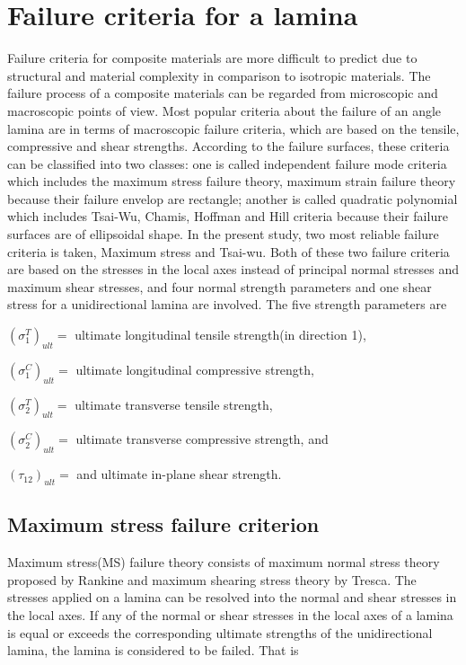 \section{Failure criteria for a lamina}

Failure criteria for composite materials are more difficult to predict due to
structural and material complexity in comparison to isotropic materials. The
failure process of a composite materials can be regarded from microscopic and
macroscopic points of view. Most popular criteria about the failure of an angle
lamina are in terms of macroscopic failure criteria, which are based on the
tensile, compressive and shear strengths. According to the failure surfaces,
these criteria can be classified into two classes: one is called independent
failure mode criteria which includes the maximum stress failure theory, maximum
strain failure theory because their failure envelop are rectangle; another is
called quadratic polynomial which includes Tsai-Wu, Chamis, Hoffman and Hill
criteria because their failure surfaces are of ellipsoidal shape. In the present
study, two most reliable failure criteria is taken, Maximum stress and Tsai-wu.
Both of these two failure criteria are based on the stresses in the local axes
instead of principal normal stresses and maximum shear stresses, and four normal
strength parameters and one shear stress for a unidirectional lamina are
involved. The five strength parameters are

$(\sigma _1^{T})_{ult}= $ ultimate longitudinal tensile strength(in direction 1),

$(\sigma _1^{C})_{ult}= $ ultimate longitudinal compressive strength,

$(\sigma _2^{T})_{ult}= $ ultimate transverse tensile strength,

$(\sigma _2^{C})_{ult}= $ ultimate transverse compressive strength, and

$(\tau_{12})_{ult}= $ and ultimate in-plane shear strength.

\subsection{Maximum stress failure criterion}
Maximum stress(MS) failure theory consists of maximum normal stress theory
proposed by Rankine and maximum shearing stress theory by Tresca. The stresses
applied on a lamina can be resolved into the normal and shear stresses in the
local axes. If any of the normal or shear stresses in the local axes of a lamina
is equal or exceeds the corresponding ultimate strengths of the unidirectional
lamina, the lamina is considered to be failed. That is

